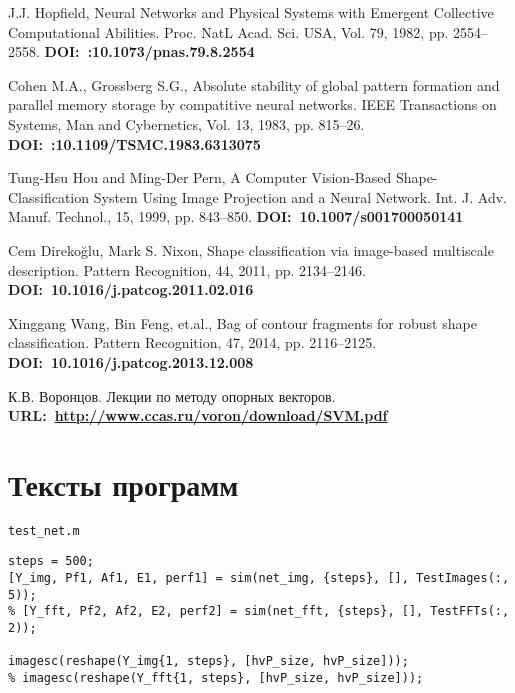 \documentclass[12pt,a4paper]{article}
\begin{document}
\begin{thebibliography}{99}
 J.J. Hopfield, Neural Networks and Physical Systems with Emergent Collective Computational Abilities. Proc. NatL Acad. Sci. USA, Vol. 79, 1982, pp. 2554--2558. \textbf{DOI:~:10.1073/pnas.79.8.2554}

 Cohen M.A., Grossberg S.G., Absolute stability of global pattern formation and parallel memory storage by compatitive neural networks. IEEE Transactions on Systems, Man and Cybernetics, Vol. 13, 1983, pp. 815--26. \textbf{DOI:~:10.1109/TSMC.1983.6313075}
%
%

 Tung-Hsu Hou and Ming-Der Pern, A Computer Vision-Based Shape-Classification System Using
Image Projection and a Neural Network.
Int. J. Adv. Manuf. Technol., 15, 1999, pp. 843--850.
\textbf{DOI:~10.1007/s001700050141}

 Cem Direko\u{g}lu, Mark S. Nixon, Shape classification via image-based multiscale description.
Pattern Recognition, 44, 2011, pp. 2134--2146. \textbf{DOI:~10.1016/j.patcog.2011.02.016}

 Xinggang Wang, Bin Feng, et.al., Bag of contour fragments for robust shape classification.
Pattern Recognition, 47, 2014, pp. 2116--2125. \textbf{DOI:~10.1016/j.patcog.2013.12.008}

 К.В. Воронцов. Лекции по методу опорных векторов. \textbf{URL:~\url{http://www.ccas.ru/voron/download/SVM.pdf}}

\end{thebibliography}


\newpage
\appendix 
{}

\section*{Тексты программ}
\verb|test_net.m|
\begin{lstlisting}
steps = 500;
[Y_img, Pf1, Af1, E1, perf1] = sim(net_img, {steps}, [], TestImages(:, 5));
% [Y_fft, Pf2, Af2, E2, perf2] = sim(net_fft, {steps}, [], TestFFTs(:, 2));

imagesc(reshape(Y_img{1, steps}, [hvP_size, hvP_size]));
% imagesc(reshape(Y_fft{1, steps}, [hvP_size, hvP_size]));
\end{lstlisting}
\end{document}
